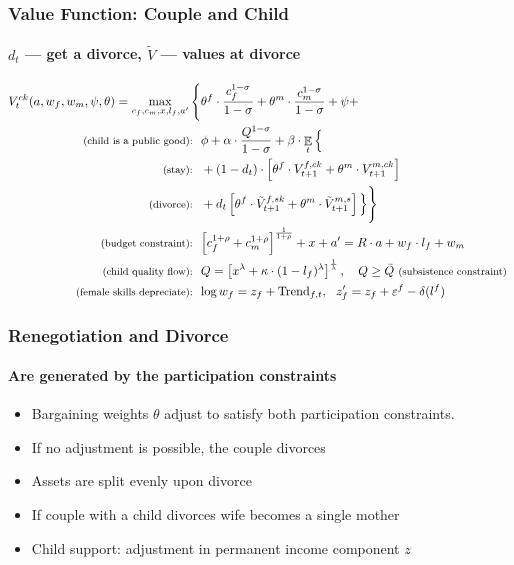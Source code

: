 \documentclass[aspectratio=169]{beamer}
\DeclareMathOperator{\E}{\mathbb{E}}
\let\olditem\item
\renewcommand{\item}{%
\olditem\vspace{\fill}}
\begin{document}
\begin{frame}
\frametitle{Value Function: Couple and Child}
\framesubtitle{$d_t$ --- get a divorce, $\tilde{V}$ --- values at divorce}
\begin{align*}
V^{ck}_t(a,w_f,w_m,\psi,\theta) = \max\limits_{c_f,c_m,x,l_f,a'} \Bigg\{ & \theta^f \cdot \frac{c_f^{1-\sigma}}{{1-\sigma}}  + \theta^m \cdot \frac{c_m^{1-\sigma}}{1-\sigma}  + \psi + \\ \text{ \footnotesize (child is a public good): \ }  & \phi + \alpha \cdot \frac{Q^{1-\sigma}}{1-\sigma} +  \beta \cdot \E_t \Big\{   \\
\text{ \footnotesize (stay): \ } & + (1-d_t) \cdot  \left[ \theta^f \cdot  V^{f,ck}_{t+1} + \theta^m \cdot V^{m,ck}_{t+1}  \right] \\
\text{ \footnotesize (divorce): \ } & + d_t  \left[ \theta^f \cdot  \tilde V^{f,sk}_{t+1} + \theta^m \cdot \tilde V^{m,s}_{t+1}  \right]  \Big\} \Bigg\}\\
\text{ \footnotesize (budget constraint): \ } &{\normalsize \left[c_f^{1+\rho} + c_m^{1+\rho}\right]^{\frac1{1+\rho}} + x + a' = R\cdot a + w_f\cdot l_f + w_m}\\
\text{ \footnotesize (child quality flow): \ } &{\normalsize Q = \left[x^\lambda + \kappa \cdot (1-l_f)^\lambda\right]^{\frac1\lambda}, \ \ \ Q\geq \bar{Q}} \text{ \footnotesize  (subsistence constraint) } \\
\text{ \footnotesize (female skills depreciate): \ } &{\normalsize \log w_f = z_f + \text{Trend}_{f,t}, \ \ z'_f = z_f + \varepsilon^f - \delta(l^f)}\\
\end{align*}
\end{frame}



\begin{frame}
\frametitle{Renegotiation and Divorce}
\framesubtitle{Are generated by the participation constraints}
\begin{itemize}
\item Bargaining weights $\theta$ adjust to satisfy both participation constraints.
\item If no adjustment is possible, the couple divorces
\item Assets are split evenly upon divorce
\item If couple with a child divorces wife becomes a single mother
\item Child support: adjustment in permanent income component $z$
\end{itemize}
\end{frame}
\end{document}
